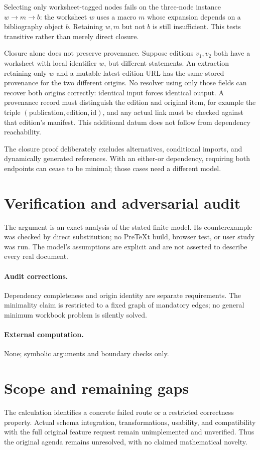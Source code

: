 \documentclass[11pt]{article}
\begin{document}
Selecting only worksheet-tagged nodes fails on the three-node instance $w\to m\to b$: the worksheet $w$ uses a macro $m$ whose expansion depends on a bibliography object $b$. Retaining $w,m$ but not $b$ is still insufficient. This tests transitive rather than merely direct closure.

Closure alone does not preserve provenance. Suppose editions $v_1,v_2$ both have a worksheet with local identifier $w$, but different statements. An extraction retaining only $w$ and a mutable latest-edition URL has the same stored provenance for the two different origins. No resolver using only those fields can recover both origins correctly: identical input forces identical output. A provenance record must distinguish the edition and original item, for example the triple $(\text{publication},\text{edition},\text{id})$, and any actual link must be checked against that edition's manifest. This additional datum does not follow from dependency reachability.

The closure proof deliberately excludes alternatives, conditional imports, and dynamically generated references. With an either-or dependency, requiring both endpoints can cease to be minimal; those cases need a different model.
\section{Verification and adversarial audit}
The argument is an exact analysis of the stated finite model. Its counterexample was checked by direct substitution; no PreTeXt build, browser test, or user study was run. The model's assumptions are explicit and are not asserted to describe every real document.
\paragraph{Audit corrections.} Dependency completeness and origin identity are separate requirements. The minimality claim is restricted to a fixed graph of mandatory edges; no general minimum workbook problem is silently solved.
\paragraph{External computation.} None; symbolic arguments and boundary checks only.
\section{Scope and remaining gaps}
The calculation identifies a concrete failed route or a restricted correctness property. Actual schema integration, transformations, usability, and compatibility with the full original feature request remain unimplemented and unverified. Thus the original agenda remains unresolved, with no claimed mathematical novelty.
\end{document}
